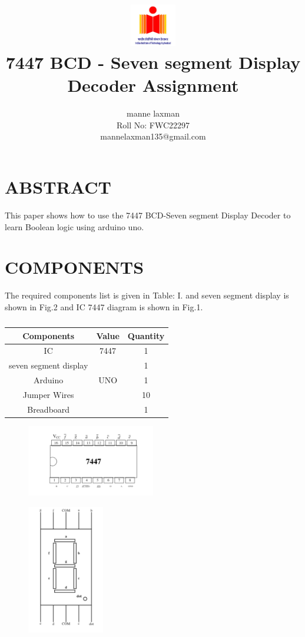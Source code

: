 \documentclass[conference]{IEEEtran}
\title{
    \vspace{1cm}
    {\includegraphics[width=0.15\textwidth]{iith.jpg} \\ 7447 BCD - Seven segment Display Decoder Assignment} }
\author{manne laxman\\ Roll No: FWC22297 \\mannelaxman135@gmail.com}
\begin{document}
     \maketitle
      \section {ABSTRACT}
       This paper shows how to use the 7447 BCD-Seven segment Display Decoder to learn Boolean logic using arduino uno.

       \section{COMPONENTS}
       The required components list is given in Table: I. and seven segment display is shown in Fig.2 and IC 7447 diagram is shown in Fig.1.
       \vspace{0.3cm}
        \begin{table} [htbp]
	\centering
	\begin{tabular}{| c | c | c |} \hline
	Components & Value & Quantity \\\hline
	IC & 7447 & 1 \\ \hline
	seven segment display & & 1\\ \hline
	Arduino & UNO & 1 \\ \hline
	Jumper Wires &  & 10 \\ \hline
	Breadboard & & 1 \\
	\hline
	\end{tabular}
	\vspace{0.3cm}
	\caption{\label{tab:widgets}}
	\end{table}

	\begin{figure}[h]
	\centering
	\includegraphics[width=0.5\textwidth]{imm.jpg}
	\caption{\label{fig-1:Gates}}
	\end{figure}

	\begin{figure}[h]
	\centering
	\includegraphics[width=0.3\textwidth]{seg.jpg}
	\caption{\label{fig-2:Gates}}
	\end{figure}
\end{document}
